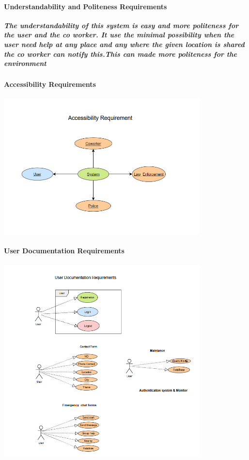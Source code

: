 \documentclass{article}
\begin{document}
\paragraph{Understandability and Politeness Requirements}
\subparagraph{The understandability of this system is easy and more politeness for the user and the co worker. It use  the minimal possibility when the user need help at any place and any where the given location is shared the co worker can notify this.This can made more politeness for the environment}


\paragraph{Accessibility Requirements}
\includegraphics[width=0.8\textwidth]{Accessibility_Requirement.png}




\newpage
\paragraph{User Documentation Requirements}
\includegraphics[width=0.8\textwidth]{User_Documentation_Requirement.png}
\end{document}
